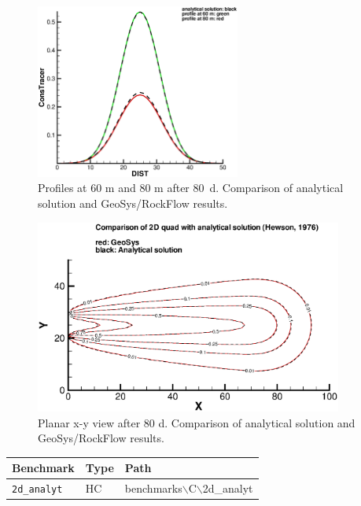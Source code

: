 \begin{figure}[htbp]
\centering
\includegraphics[width=0.6\textwidth]{C/figures/2d_profiles.eps}
\caption{Profiles at 60 m and 80 m after 80~d. Comparison of analytical solution and GeoSys/RockFlow results.}
\label{out60m}
\end{figure}


\begin{figure}[htbp]
\centering
\includegraphics[width=0.9\textwidth]{C/figures/2d_domain.eps}
\caption{Planar x-y view after 80 d. Comparison of analytical solution and GeoSys/RockFlow results.}
\label{tri_ref_layout}
\end{figure}

\begin{table}[htbp]
\centering
\begin{tabular}{|l|l|l|}
\hline
Benchmark & Type & Path \\
\hline
\texttt{2d\_analyt}& HC &  benchmarks$\backslash$C$\backslash$2d\_analyt  \\			
\hline
\end{tabular}
\end{table}





